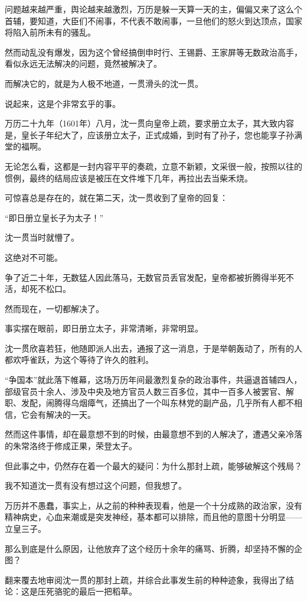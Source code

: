 \begin{multicols}{\theparacolNo}
		问题越来越严重，舆论越来越激烈，万历是躲一天算一天的主，偏偏又来了这么个首辅，要知道，大臣们不闹事，不代表不敢闹事，一旦他们的怒火到达顶点，国家将陷入前所未有的骚乱。

		然而动乱没有爆发，因为这个曾经搞倒申时行、王锡爵、王家屏等无数政治高手，看似永远无法解决的问题，竟然被解决了。

		而解决它的，就是为人极不地道，一贯滑头的沈一贯。

		说起来，这是个非常玄乎的事。

		万历二十九年（1601年）八月，沈一贯向皇帝上疏，要求册立太子，其大致内容是，皇长子年纪大了，应该册立太子，正式成婚，到时有了孙子，您也能享子孙满堂的福啊。

		无论怎么看，这都是一封内容平平的奏疏，立意不新颖，文采很一般，按照以往的惯例，最终的结局应该是被压在文件堆下几年，再拉出去当柴禾烧。

		可惊喜总是存在的，就在第二天，沈一贯收到了皇帝的回复：

		“即日册立皇长子为太子！”

		沈一贯当时就懵了。

		这绝对不可能。

		争了近二十年，无数猛人因此落马，无数官员丢官发配，皇帝都被折腾得半死不活，却死不松口。

		然而现在，一切都解决了。

		事实摆在眼前，即日册立太子，非常清晰，非常明显。

		沈一贯欣喜若狂，他随即派人出去，通报了这一消息，于是举朝轰动了，所有的人都欢呼雀跃，为这个等待了许久的胜利。

		“争国本”就此落下帷幕，这场万历年间最激烈复杂的政治事件，共逼退首辅四人，部级官员十余人、涉及中央及地方官员人数三百多位，其中一百多人被罢官、解职、发配，闹腾得乌烟瘴气，还搞出了一个叫东林党的副产品，几乎所有人都不相信，它会有解决的一天。

		然而这件事情，却在最意想不到的时候，由最意想不到的人解决了，遭遇父亲冷落的朱常洛终于修成正果，荣登太子。

		但此事之中，仍然存在着一个最大的疑问：为什么那封上疏，能够破解这个残局？

		我不知道沈一贯有没有想过这个问题，但我想了。

		万历并不愚蠢，事实上，从之前的种种表现看，他是一个十分成熟的政治家，没有精神病史，心血来潮或是突发神经，基本都可以排除，而且他的意图十分明显——立皇三子。

		那么到底是什么原因，让他放弃了这个经历十余年的痛骂、折腾，却坚持不懈的企图？

		翻来覆去地审阅沈一贯的那封上疏，并综合此事发生前的种种迹象，我得出了结论：这是压死骆驼的最后一把稻草。


\end{multicols}
